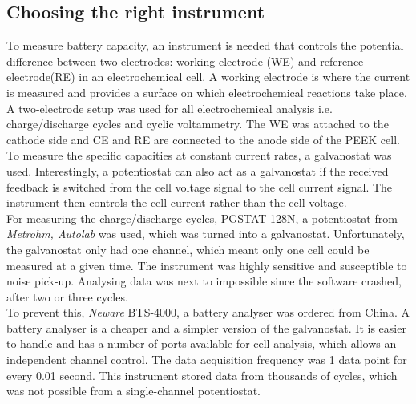 \subsection*{Choosing the right instrument}
To measure battery capacity, an instrument is needed that controls the potential difference between two electrodes: working electrode (WE) and reference electrode(RE) in an electrochemical cell. A working electrode is where the current is measured and provides a surface on which electrochemical reactions take place. A two-electrode setup was used for all electrochemical analysis i.e. charge/discharge cycles and cyclic voltammetry. The WE was attached to the cathode side and CE and RE are connected to the anode side of the PEEK cell. To measure the specific capacities at constant current rates, a galvanostat was used. Interestingly, a potentiostat can also act as a galvanostat if the received feedback is switched from the cell voltage signal to the cell current signal. The instrument then controls the cell current rather than the cell voltage. \\
For measuring the charge/discharge cycles, PGSTAT-128N, a potentiostat from \textit{Metrohm, Autolab} was used, which was turned into a galvanostat. Unfortunately, the galvanostat only had one channel, which meant only one cell could be measured at a given time. The instrument was highly sensitive and susceptible to noise pick-up. Analysing data was next to impossible since the software crashed, after two or three cycles. \\
To prevent this, \textit{Neware} BTS-4000, a battery analyser was ordered from China. A battery analyser is a cheaper and a simpler version of the galvanostat. It is easier to handle and has a number of ports available for cell analysis, which allows an independent channel control. The data acquisition frequency was 1 data point for every 0.01 second. This instrument stored data from thousands of cycles, which was not possible from a single-channel potentiostat. 


